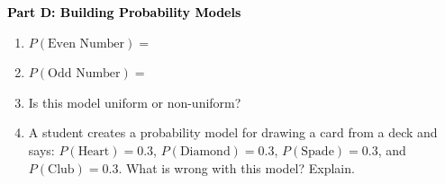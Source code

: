 \documentclass[12pt, letterpaper, fleqn]{article}
\newcommand{\blank}{\underline{\hspace{2.2cm}}}
\begin{document}
\newpage

\begin{tcolorbox}[colback=customteal!20]
\large\textcolor{black}{\textbf{Part D: Building Probability Models}}
\end{tcolorbox}

\vspace{3mm}

\begin{enumerate}[itemsep=2.5cm, leftmargin=0.6cm, resume]
\item $P(\text{Even Number}) = $ \blank
\item $P(\text{Odd Number}) = $ \blank
\item Is this model uniform or non-uniform? \blank
\item A student creates a probability model for drawing a card from a deck and says: $P(\text{Heart}) = 0.3$, $P(\text{Diamond}) = 0.3$, $P(\text{Spade}) = 0.3$, and $P(\text{Club}) = 0.3$. What is wrong with this model? Explain.
\end{enumerate}
\end{document}
